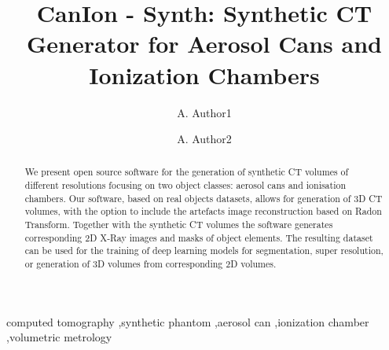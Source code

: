 \documentclass[preprint,12pt, a4paper]{elsarticle}
\begin{document}
\renewcommand{\labelenumii}{\arabic{enumi}.\arabic{enumii}}

\begin{frontmatter}



\title{CanIon - Synth: Synthetic CT Generator for Aerosol Cans and Ionization Chambers}

\author[label1]{A. Author1}
\author[label2]{A. Author2}
\address[label1]{Author1's affiliation, address, email}
\address[label2]{Author2's affiliation, address, email}

\begin{abstract}
We present open source software for the generation of synthetic CT volumes of different resolutions focusing on two object classes: aerosol cans and ionisation chambers. Our software, based on real objects datasets, allows for generation of 3D CT volumes, with the option to include the artefacts image reconstruction based on Radon Transform. Together with the synthetic CT volumes the software generates corresponding 2D X-Ray images and masks of object elements. The resulting dataset can be used for the training of deep learning models for segmentation, super resolution, or generation of 3D volumes from corresponding 2D volumes.
\end{abstract}

\begin{keyword}
computed tomography \sep synthetic phantom \sep aerosol can \sep ionization chamber \sep volumetric metrology
\end{keyword}

\end{frontmatter}
\end{document}

